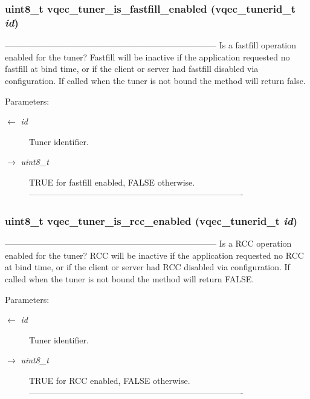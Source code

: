 \subsubsection{\setlength{\rightskip}{0pt plus 5cm}uint8\_\-t vqec\_\-tuner\_\-is\_\-fastfill\_\-enabled (vqec\_\-tunerid\_\-t {\em id})}\label{vqec__tuner_8h_ea34bc8b1f251e13dd145336b94a5d28}


--------------------------------------------------------------------------- Is a fastfill operation enabled for the tuner? Fastfill will be inactive if the application requested no fastfill at bind time, or if the client or server had fastfill disabled via configuration. If called when the tuner is not bound the method will return false.

\begin{Desc}
\item[Parameters:]
\begin{description}
\item[\mbox{$\leftarrow$} {\em id}]Tuner identifier. \item[\mbox{$\rightarrow$} {\em uint8\_\-t}]TRUE for fastfill enabled, FALSE otherwise. ---------------------------------------------------------------------------- \end{description}
\end{Desc}
\subsubsection{\setlength{\rightskip}{0pt plus 5cm}uint8\_\-t vqec\_\-tuner\_\-is\_\-rcc\_\-enabled (vqec\_\-tunerid\_\-t {\em id})}\label{vqec__tuner_8h_5fb2cc65331f006b110100d86b278821}


--------------------------------------------------------------------------- Is a RCC operation enabled for the tuner? RCC will be inactive if the application requested no RCC at bind time, or if the client or server had RCC disabled via configuration. If called when the tuner is not bound the method will return FALSE.

\begin{Desc}
\item[Parameters:]
\begin{description}
\item[\mbox{$\leftarrow$} {\em id}]Tuner identifier. \item[\mbox{$\rightarrow$} {\em uint8\_\-t}]TRUE for RCC enabled, FALSE otherwise. ---------------------------------------------------------------------------- \end{description}
\end{Desc}
